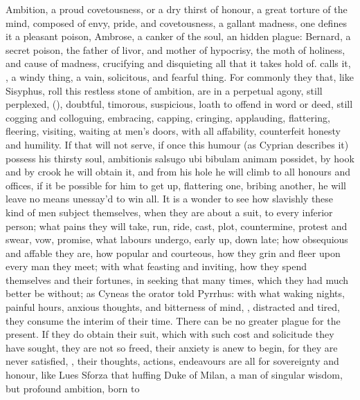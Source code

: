 {{Ambition, a proud covetousness, or a dry thirst of honour, a great
torture of the mind, composed of envy, pride, and covetousness, a
gallant madness, one defines it a pleasant poison, Ambrose, a
canker of the soul, an hidden plague: Bernard, a secret poison,
the father of livor, and mother of hypocrisy, the moth of holiness, and
cause of madness, crucifying and disquieting all that it takes hold of.
\Seneca calls it, , a windy
thing, a vain, solicitous, and fearful thing. For commonly they that,
like Sisyphus, roll this restless stone of ambition, are in a perpetual
agony, still perplexed, 
(\Lucretius{}), doubtful, timorous, suspicious, loath to offend in word or
deed, still cogging and colloguing, embracing, capping, cringing,
applauding, flattering, fleering, visiting, waiting at men's doors,
with all affability, counterfeit honesty and humility. If that
will not serve, if once this humour (as Cyprian describes it)
possess his thirsty soul, ambitionis salsugo ubi bibulam animam
possidet, by hook and by crook he will obtain it, and from his hole he
will climb to all honours and offices, if it be possible for him to get
up, flattering one, bribing another, he will leave no means unessay'd
to win all. It is a wonder to see how slavishly these kind of men
subject themselves, when they are about a suit, to every inferior
person; what pains they will take, run, ride, cast, plot, countermine,
protest and swear, vow, promise, what labours undergo, early up, down
late; how obsequious and affable they are, how popular and courteous,
how they grin and fleer upon every man they meet; with what feasting
and inviting, how they spend themselves and their fortunes, in seeking
that many times, which they had much better be without; as Cyneas
the orator told Pyrrhus: with what waking nights, painful hours,
anxious thoughts, and bitterness of mind, ,
distracted and tired, they consume the interim of their time. There can
be no greater plague for the present. If they do obtain their suit,
which with such cost and solicitude they have sought, they are not so
freed, their anxiety is anew to begin, for they are never satisfied,
, their thoughts, actions, endeavours
are all for sovereignty and honour, like Lues Sforza that huffing
Duke of Milan, a man of singular wisdom, but profound ambition, born to
}}
